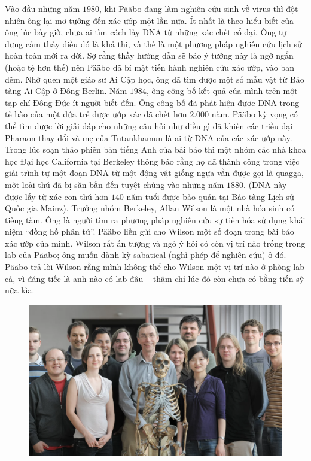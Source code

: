 \begin{multicols}{2}
	\vskip 0.2cm
	\vskip 0.2cm
	Vào đầu những năm $1980$, khi Pääbo đang làm nghiên cứu sinh về virus thì đột nhiên ông lại mơ tưởng đến xác ướp một lần nữa. Ít nhất là theo hiểu biết của ông lúc bấy giờ, chưa ai tìm cách lấy DNA từ những xác chết cổ đại. Ông tự dưng cảm thấy điều đó là khả thi, và thế là một phương pháp nghiên cứu lịch sử hoàn toàn mới ra đời.
	\vskip 0.1cm
	Sợ rằng thầy hướng dẫn sẽ bảo ý tưởng này là ngớ ngẩn (hoặc tệ hơn thế) nên Pääbo đã bí mật tiến hành nghiên cứu xác ướp, vào ban đêm. Nhờ quen một giáo sư Ai Cập học, ông đã tìm được một số mẫu vật từ Bảo tàng Ai Cập ở Đông Berlin. Năm $1984$, ông công bố kết quả của mình trên một tạp chí Đông Đức ít người biết đến. Ông công bố đã phát hiện được DNA trong tế bào của một đứa trẻ được ướp xác đã chết hơn $2{.}000$ năm. Pääbo kỳ vọng có thể tìm được lời giải đáp cho những câu hỏi như điều gì đã khiến các triều đại Pharaon thay đổi và mẹ của Tutankhamun là ai từ DNA của các xác ướp này.
	\vskip 0.1cm
	Trong lúc soạn thảo phiên bản tiếng Anh của bài báo thì một nhóm các nhà khoa học Đại học California tại Berkeley thông báo rằng họ đã thành công trong việc giải trình tự một đoạn DNA từ một động vật giống ngựa vằn được gọi là quagga, một loài thú đã bị săn bắn đến tuyệt chủng vào những năm $1880$. (DNA này được lấy từ xác con thú hơn $140$ năm tuổi được bảo quản tại Bảo tàng Lịch sử Quốc gia Mainz). Trưởng nhóm Berkeley, Allan Wilson là một nhà hóa sinh có tiếng tăm. Ông là người tìm ra phương pháp nghiên cứu sự tiến hóa sử dụng khái niệm “đồng hồ phân tử”. Pääbo liền gửi cho Wilson một số đoạn trong bài báo xác ướp của mình. Wilson rất ấn tượng và ngỏ ý hỏi có còn vị trí nào trống trong lab của Pääbo; ông muốn dành kỳ sabatical (nghỉ phép để nghiên cứu) ở đó. Pääbo trả lời Wilson rằng mình không thể cho Wilson một vị trí nào ở phòng lab cả, vì đáng tiếc là anh nào có lab đâu -- thậm chí lúc đó còn chưa có bằng tiến sỹ nữa kìa.
	\begin{figure}[H]
		\vspace*{-5pt}
		\centering
		\captionsetup{labelformat= empty, justification=centering}
		\includegraphics[width= 1\linewidth]{2}

\end{figure}
\end{multicols}
